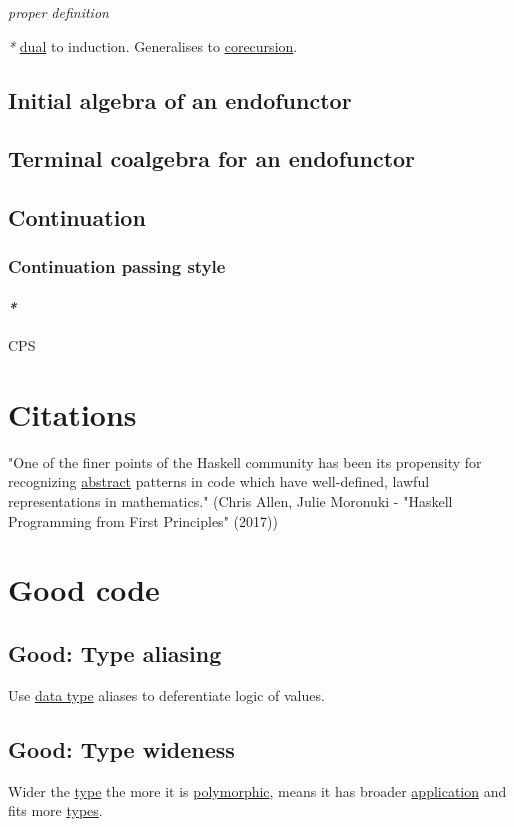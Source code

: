 \documentclass[a4paper,14pt,oneside]{book}
\begin{document}
\emph{proper definition}

\emph{*} \hyperref[org704130f]{dual} to induction.
Generalises to \hyperref[org6f8dc84]{corecursion}.

\chapter{\label{org7956987}Initial algebra of an endofunctor}
\label{sec:org8c19b21}
\chapter{\label{orgd7e6996}Terminal coalgebra for an endofunctor}
\label{sec:org60fae74}
\chapter{Continuation}
\label{sec:org73e81ad}
\section{Continuation passing style}
\label{sec:orgc198205}

\subsection{\emph{*}}
\label{sec:org103bc61}

CPS

\part{Citations}
\label{sec:orgd106138}

"One of the finer points of the Haskell community has been its propensity for recognizing \hyperref[org28719f1]{abstract} patterns in code which have well-defined, lawful representations in mathematics." (Chris Allen, Julie Moronuki - "Haskell Programming from First Principles" (2017))

\part{Good code}
\label{sec:org175e788}
\chapter{\label{org6673a5d}Good: Type aliasing}
\label{sec:org13e3470}
Use \hyperref[org76f6ae1]{data type} aliases to deferentiate logic of values.

\chapter{\label{org85d4d2f}Good: Type wideness}
\label{sec:org9f3c52a}
Wider the \hyperref[orga7d212f]{type} the more it is \hyperref[orgf7426a0]{polymorphic}, means it has broader \hyperref[org840185e]{application} and fits more \hyperref[orgafd8fcb]{types}.
\end{document}
